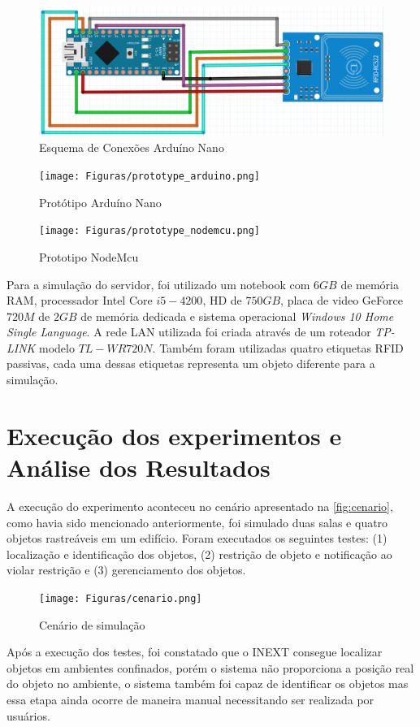 \begin{figure}[H]
              \caption{\label{fig:esq_conexoes_arduino}{Esquema de Conexões Arduíno Nano}}
              \centering
              \includegraphics[width=1\textwidth]{Figuras/esquema_de_conexoes1.PNG}
\end{figure}
\begin{figure}[H]
              \caption{\label{fig:prototipo_arduino}{Protótipo Arduíno Nano}}
              \centering
              \texttt{[image: Figuras/prototype\_arduino.png]}            
\end{figure}\begin{figure}[H]
              \caption{\label{fig:prototipo_nodemcu}{Prototipo NodeMcu}}
              \centering
              \texttt{[image: Figuras/prototype\_nodemcu.png]}
\end{figure}
\par
Para a simulação do servidor, foi utilizado um notebook com $6GB$ de memória RAM, processador Intel Core $i5-4200$, HD de $750GB$, placa de video GeForce $720M$ de $2GB$ de memória dedicada e sistema operacional \textit{Windows 10 Home Single Language}. A rede LAN utilizada foi criada através de um roteador \textit{TP-LINK} modelo $TL-WR720N$. Também foram utilizadas quatro etiquetas RFID passivas, cada uma dessas etiquetas representa um objeto diferente para a simulação.

\section{Execução dos experimentos e Análise dos Resultados}
A execução do experimento aconteceu no cenário apresentado na \autoref{fig:cenario}, como havia sido mencionado anteriormente, foi simulado duas salas e quatro objetos rastreáveis em um edifício. Foram executados os seguintes testes: (1) localização e identificação dos objetos, (2) restrição de objeto e notificação ao violar restrição e (3) gerenciamento dos objetos.
\begin{figure}[H]
              \caption{\label{fig:cenario}{Cenário de simulação}}
              \centering
              \texttt{[image: Figuras/cenario.png]}
\end{figure}
\par
Após a execução dos testes, foi constatado que o INEXT consegue localizar objetos em ambientes confinados, porém o sistema não proporciona a posição real do objeto no ambiente, o sistema também foi capaz de identificar os objetos mas essa etapa ainda ocorre de maneira manual necessitando ser realizada por usuários.

